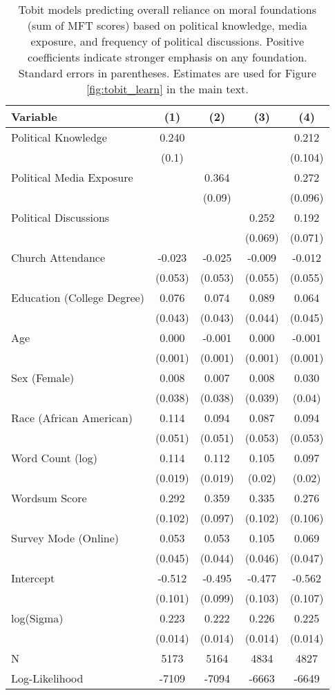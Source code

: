 \begin{table}[ht]
\centering
\caption{Tobit models predicting overall reliance on moral foundations
           (sum of MFT scores) based on political knowledge, media exposure, and frequency of 
           political discussions. Positive coefficients indicate stronger emphasis on any foundation.
           Standard errors in parentheses. Estimates are used for Figure \ref{fig:tobit_learn} in 
           the main text.} 
\label{tab:tobit_learn}
\begingroup\footnotesize
\begin{tabular}{lcccc}
  \hline
Variable & (1) & (2) & (3) & (4) \\ 
  \hline
Political Knowledge &  0.240 &  &  &  0.212 \\ 
   & (0.1) &  &  & (0.104) \\ 
  Political Media Exposure &  &  0.364 &  &  0.272 \\ 
   &  & (0.09) &  & (0.096) \\ 
  Political
Discussions &  &  &  0.252 &  0.192 \\ 
   &  &  & (0.069) & (0.071) \\ 
  Church Attendance & -0.023 & -0.025 & -0.009 & -0.012 \\ 
   & (0.053) & (0.053) & (0.055) & (0.055) \\ 
  Education (College Degree) &  0.076 &  0.074 &  0.089 &  0.064 \\ 
   & (0.043) & (0.043) & (0.044) & (0.045) \\ 
  Age &  0.000 & -0.001 &  0.000 & -0.001 \\ 
   & (0.001) & (0.001) & (0.001) & (0.001) \\ 
  Sex (Female) &  0.008 &  0.007 &  0.008 &  0.030 \\ 
   & (0.038) & (0.038) & (0.039) & (0.04) \\ 
  Race (African American) &  0.114 &  0.094 &  0.087 &  0.094 \\ 
   & (0.051) & (0.051) & (0.053) & (0.053) \\ 
  Word Count (log) &  0.114 &  0.112 &  0.105 &  0.097 \\ 
   & (0.019) & (0.019) & (0.02) & (0.02) \\ 
  Wordsum Score &  0.292 &  0.359 &  0.335 &  0.276 \\ 
   & (0.102) & (0.097) & (0.102) & (0.106) \\ 
  Survey Mode (Online) &  0.053 &  0.053 &  0.105 &  0.069 \\ 
   & (0.045) & (0.044) & (0.046) & (0.047) \\ 
  Intercept & -0.512 & -0.495 & -0.477 & -0.562 \\ 
   & (0.101) & (0.099) & (0.103) & (0.107) \\ 
  log(Sigma) &  0.223 &  0.222 &  0.226 &  0.225 \\ 
   & (0.014) & (0.014) & (0.014) & (0.014) \\ 
   \hline
N & 5173 & 5164 & 4834 & 4827 \\ 
  Log-Likelihood & -7109 & -7094 & -6663 & -6649 \\ 
   \hline
\end{tabular}
\endgroup
\end{table}
